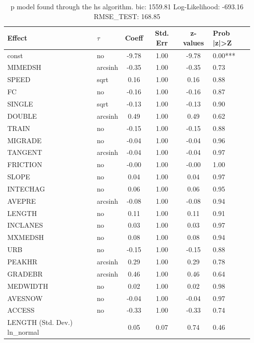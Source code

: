 \begin{table}
	\caption{p model found through the hs algorithm. bic: 1559.81 Log-Likelihood: -693.16 RMSE_TEST: 168.85}
	\begin{center}
		\begin{tabular}{|l|l|c|c|c|l|}
			\hline
			Effect & $\tau$ & Coeff & Std. Err & z-values & Prob |z|>Z \\
			\hline
			const & no & -9.78 & 1.00 & -9.78 & 0.00*** \\
			\hline
			MIMEDSH & arcsinh & -0.35 & 1.00 & -0.35 & 0.73 \\
			\hline
			SPEED & sqrt & 0.16 & 1.00 & 0.16 & 0.88 \\
			\hline
			FC & no & -0.16 & 1.00 & -0.16 & 0.87 \\
			\hline
			SINGLE & sqrt & -0.13 & 1.00 & -0.13 & 0.90 \\
			\hline
			DOUBLE & arcsinh & 0.49 & 1.00 & 0.49 & 0.62 \\
			\hline
			TRAIN & no & -0.15 & 1.00 & -0.15 & 0.88 \\
			\hline
			MIGRADE & no & -0.04 & 1.00 & -0.04 & 0.96 \\
			\hline
			TANGENT & arcsinh & -0.04 & 1.00 & -0.04 & 0.97 \\
			\hline
			FRICTION & no & -0.00 & 1.00 & -0.00 & 1.00 \\
			\hline
			SLOPE & no & 0.04 & 1.00 & 0.04 & 0.97 \\
			\hline
			INTECHAG & no & 0.06 & 1.00 & 0.06 & 0.95 \\
			\hline
			AVEPRE & arcsinh & -0.08 & 1.00 & -0.08 & 0.94 \\
			\hline
			LENGTH & no & 0.11 & 1.00 & 0.11 & 0.91 \\
			\hline
			INCLANES & no & 0.03 & 1.00 & 0.03 & 0.97 \\
			\hline
			MXMEDSH & no & 0.08 & 1.00 & 0.08 & 0.94 \\
			\hline
			URB & no & -0.15 & 1.00 & -0.15 & 0.88 \\
			\hline
			PEAKHR & arcsinh & 0.29 & 1.00 & 0.29 & 0.78 \\
			\hline
			GRADEBR & arcsinh & 0.46 & 1.00 & 0.46 & 0.64 \\
			\hline
			MEDWIDTH & no & 0.02 & 1.00 & 0.02 & 0.98 \\
			\hline
			AVESNOW & no & -0.04 & 1.00 & -0.04 & 0.97 \\
			\hline
			ACCESS & no & -0.33 & 1.00 & -0.33 & 0.74 \\
			\hline
			LENGTH (Std. Dev.) ln_normal &  & 0.05 & 0.07 & 0.74 & 0.46 \\

\end{tabular}
\end{center}
\end{table}
